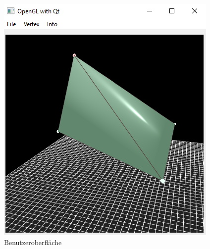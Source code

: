 \begin{figure}[H]
\centering
\includegraphics[width=0.7\linewidth]{GUI.png}
\caption{Benutzeroberfläche}
\label{fig9}
\end{figure}
	

	

		